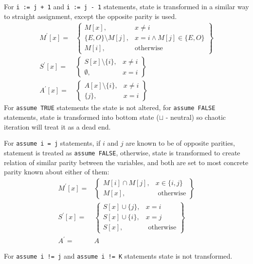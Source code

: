 For \texttt{i := j + 1} and \texttt{i := j - 1} statements, state is transformed in a similar way to straight assignment, except the opposite parity is used.
\begin{align*}
M^\prime[x] = & \left.
	\begin{cases}
		M[x], & x\ne i \\
		\{E, O\} \setminus M[j], & x = i \wedge M[j] \in \{E, O\} \\
		M[i], & \text{otherwise}
	\end{cases}
\right\}\\
S^\prime[x] = & \left.
	\begin{cases}
		S[x] \setminus \{i\}, & x\ne i \\
		\emptyset, & x = i 
	\end{cases}
\right\}\\
A^\prime[x] = & \left.
\begin{cases}
	A[x] \setminus \{i\}, & x\ne i \\
	\{j\}, & x = i
\end{cases}
\right\}
\end{align*}
For \texttt{assume TRUE} statements the state is not altered, for \texttt{assume FALSE} statements, state is transformed into bottom state ($\sqcup$ - neutral) so chaotic iteration will treat it as a dead end.

For \texttt{assume i = j} statements, if $i$ and $j$ are known to be of opposite parities, statement is treated as \texttt{assume FALSE}, otherwise, state is transformed to create relation of similar parity between the variables, and both are set to most concrete parity known about either of them:
\begin{align*}
M^\prime[x] = & \left.
	\begin{cases}
		M[i]\cap M[j], & x \in \{i,j\} \\
		M[x], & \text{ otherwise}
	\end{cases}
\right\}\\
S^\prime[x] = & \left.
\begin{cases}
	S[x] \cup \{j\}, & x = i \\
	S[x] \cup \{i\}, & x = j \\
	S[x], & \text{ otherwise}
\end{cases}
\right\}\\
A^\prime = & A
\end{align*}

For \texttt{assume i != j} and \texttt{assume i != K} statements state is not transformed.

